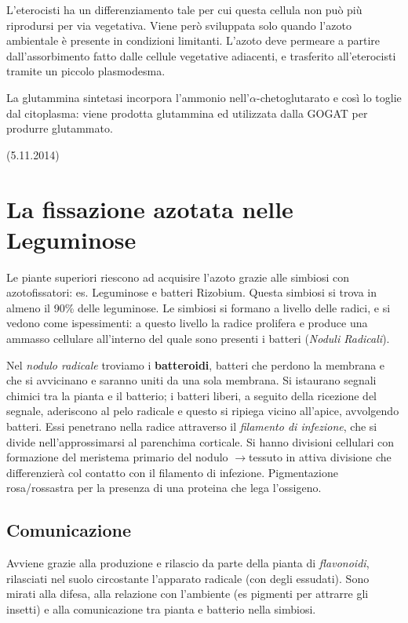 \documentclass[a4paper,12pt]{book}
\newcommand{\lfreccia}{\ensuremath{\longrightarrow}}
\begin{document}
L'eterocisti ha un differenziamento tale per cui questa cellula non può più riprodursi per via vegetativa. Viene però sviluppata solo quando l'azoto ambientale è presente in condizioni limitanti. L'azoto deve permeare a partire dall'assorbimento fatto dalle cellule vegetative adiacenti, e trasferito all'eterocisti tramite un piccolo plasmodesma.

La glutammina sintetasi incorpora l'ammonio nell'$\alpha$-chetoglutarato e così lo toglie dal citoplasma: viene prodotta glutammina ed utilizzata dalla GOGAT per produrre glutammato.

(5.11.2014)
\section{La fissazione azotata nelle Leguminose}
Le piante superiori riescono ad acquisire l'azoto grazie alle simbiosi con azotofissatori: es. Leguminose e batteri Rizobium.
Questa simbiosi si trova in almeno il 90\% delle leguminose. Le simbiosi si formano a livello delle radici, e si vedono come ispessimenti: a questo livello la radice prolifera e produce una ammasso cellulare all'interno del quale sono presenti i batteri (\emph{Noduli Radicali}).

Nel \emph{nodulo radicale} troviamo i \textbf{batteroidi}, batteri che perdono la membrana e che si avvicinano e saranno uniti da una sola membrana.
Si istaurano segnali chimici tra la pianta e il batterio; i batteri liberi, a seguito della ricezione del segnale, aderiscono al pelo radicale e questo si ripiega vicino all'apice, avvolgendo batteri. Essi penetrano nella radice attraverso il \emph{filamento di infezione}, che si divide nell'approssimarsi al parenchima corticale. Si hanno divisioni cellulari con formazione del meristema primario del nodulo \lfreccia tessuto in attiva divisione che differenzierà col contatto con il filamento di infezione.
Pigmentazione rosa/rossastra per la presenza di una proteina che lega l'ossigeno.

\subsection{Comunicazione}
Avviene grazie alla produzione e rilascio da parte della pianta di \emph{flavonoidi}, rilasciati nel suolo circostante l'apparato radicale (con degli essudati). Sono mirati alla difesa, alla relazione con l'ambiente (es pigmenti per attrarre gli insetti) e alla comunicazione tra pianta e batterio nella simbiosi.
\end{document}
